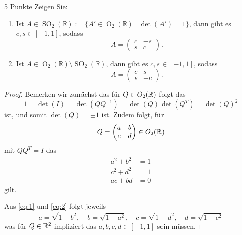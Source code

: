 \documentclass{problemset}
\begin{document}
\begin{problem}{5 Punkte}
Zeigen Sie:
\begin{enumerate}
    \item Ist $A \in \operatorname{SO}_2(\mathbb{R}) := \{A' \in
              \operatorname{O}_2(\mathbb{R}) \mid \det(A') = 1\}$, dann gibt es $c, s \in
              [-1, 1]$, sodass
          \[
              A = \begin{pmatrix}
                  c & -s \\
                  s & c
              \end{pmatrix}.
          \]
    \item Ist $A \in \operatorname{O}_2(\mathbb{R}) \setminus
              \operatorname{SO}_2(\mathbb{R})$, dann gibt es $c, s \in [-1, 1]$, sodass
          \[
              A = \begin{pmatrix}
                  c & s  \\
                  s & -c
              \end{pmatrix}.
          \]
\end{enumerate}
\begin{proof}
    Bemerken wir zunächst das für \(Q \in O_2(\mathbb{R})\) folgt das
    \begin{equation*}
        1 = \det( I ) = \det( Q Q^{-1} ) = \det( Q )\det( Q^T) = \det(Q)^2
    \end{equation*}
    ist, und somit \(\det(Q) = \pm 1\) ist.
    Zudem folgt, für \[
        Q = \begin{pmatrix}
            a & b \\
            c & d
        \end{pmatrix} \in O_2(\mathbb{R})
    \] mit \(Q Q^T = I\) das
    \begin{align}
        a^2 + b^2 & = 1 \label{eq:1} \\
        c^2 + d^2 & = 1 \label{eq:2} \\
        ac + bd   & = 0 \label{eq:3}
    \end{align}
    gilt.

    Aus \eqref{eq:1} und \eqref{eq:2} folgt jeweils
    \begin{equation*}
        a = \sqrt{1 - b^2}, \quad b = \sqrt{1 - a^2}, \quad c = \sqrt{1 - d^2}, \quad d = \sqrt{1 - c^2}
    \end{equation*}
    was für \(Q \in \mathbb{R}^2\) impliziert das \(a, b, c, d \in [-1, 1]\) sein müssen.


\end{proof}
\end{problem}
\end{document}
